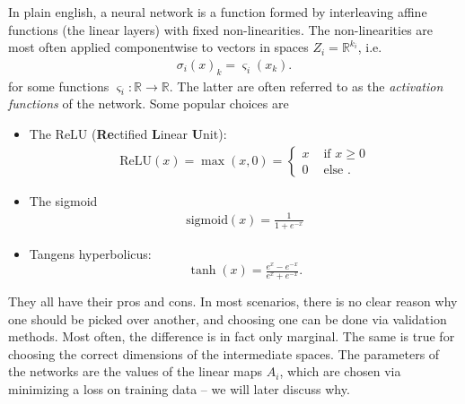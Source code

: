 \documentclass{article}
\newcommand{\R}{\mathbb{R}}
\newcommand{\ReLU}{\mathrm{ReLU}}
\newcommand{\sigmoid}{\mathrm{sigmoid}}
\begin{document}
In plain english, a neural network is a function formed by interleaving affine functions (the linear layers) with fixed non-linearities. The non-linearities are most often applied componentwise to vectors in spaces $Z_i= \R^{k_i}$, i.e.
\begin{align*}
    \sigma_i(x)_k = \varsigma_i(x_k).
\end{align*}
for some functions $\varsigma_i: \R \to \R$. The latter are often referred to as the \emph{activation functions} of the network. Some popular choices are
\begin{itemize}
    \item The $\ReLU$ (\textbf{Re}ctified \textbf{L}inear \textbf{U}nit): 
    \begin{align*}
        \ReLU(x) = \max(x,0) = \begin{cases}
            x & \text{ if } x\geq 0 \\
            0 & \text{ else }.
        \end{cases}
    \end{align*}
    \item The sigmoid
    \begin{align*}
        \sigmoid(x) = \frac{1}{1+e^{-x}}
    \end{align*}
    \item Tangens hyperbolicus:
    $$\tanh(x) = \tfrac{e^{x}-e^{-x}}{e^x+e^{-x}}.$$
\end{itemize}
They all have their pros and cons. In most scenarios, there is no clear reason why one should be picked over another, and choosing one can be done via validation methods. Most often, the difference is in fact only marginal. The same is true for choosing the correct dimensions of the intermediate spaces. The parameters of the networks are the values of the linear maps $A_i$, which are chosen via minimizing a loss on training data -- we will later discuss why. \newline
\end{document}
